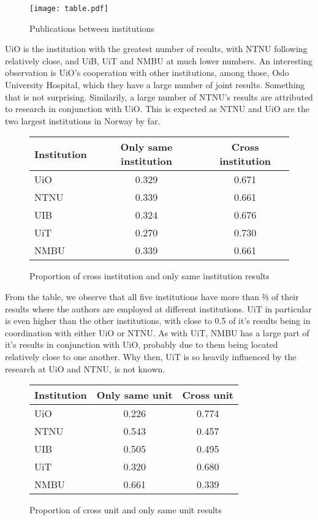 \begin{figure}[h]
  \centering
  \texttt{[image: table.pdf]}
  \caption{Publications between institutions}
  \label{fig:result}
\end{figure}

UiO is the institution with the greatest number of results, with NTNU following relatively close, and UiB, UiT and NMBU at much lower numbers.
An interesting observation is UiO’s cooperation with other institutions, among those, Oslo University Hospital, which they have a large number of joint results. Something that is not surprising.
Similarily, a large number of NTNU’s results are attributed to research in conjunction with UiO. This is expected as NTNU and UiO are the two largest institutions in Norway by far.


\begin{figure}[h]
	\centering
	\begin{tabular}{| l || c | c |}
		\hline
		Institution	& Only same institution	& Cross institution	\\ \hline
		UiO		& 0.329			& 0.671			\\
		NTNU		& 0.339			& 0.661			\\
		UIB		& 0.324			& 0.676			\\
		UiT		& 0.270			& 0.730			\\
		NMBU		& 0.339			& 0.661			\\
		\hline
	\end{tabular}
	\caption{Proportion of cross institution and only same institution results}
	\label{tab:institution-proportion}
\end{figure}

From the table, we observe that all five institutions have more than ⅔ of their results where the authors are employed at different institutions. UiT in particular is even higher than the other institutions, with close to 0.5 of it’s results being in coordination with either UiO or NTNU. As with UiT, NMBU has a large part of it’s results in conjunction with UiO, probably due to them being located relatively close to one another. Why then, UiT is so heavily influenced by the research at UiO and NTNU, is not known.

\begin{figure}[h]
	\centering
	\begin{tabular}{| l || c | c |}
		\hline
		Institution	& Only same unit	& Cross unit	\\ \hline
		UiO		& 0.226			& 0.774		\\
		NTNU		& 0.543			& 0.457		\\
		UIB		& 0.505			& 0.495		\\
		UiT		& 0.320			& 0.680		\\
		NMBU		& 0.661			& 0.339		\\
		\hline
	\end{tabular}
	\caption{Proportion of cross unit and only same unit results}
	\label{tab:unit-proportion}
\end{figure}

